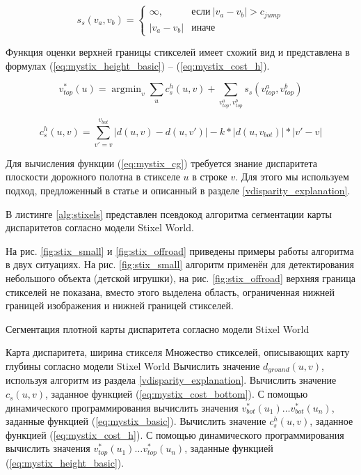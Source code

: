 \documentclass[aps,%
14pt,%
final,%
oneside,
onecolumn,%
musixtex, %
superscriptaddress,%
centertags]{extarticle} %
\DeclareMathOperator*{\argmin}{argmin}
\begin{document}
\begin{equation}\label{eq:mystix_ss}
s_s(v_a, v_b)=
\begin{cases}
  \infty,     & \text{если}\ |v_a - v_b| > c_{jump} \\
  |v_a - v_b| & \text{иначе}
\end{cases}
\end{equation}

Функция оценки верхней границы стикселей имеет схожий вид и представлена в формулах (\ref{eq:mystix_height_basic}) -- (\ref{eq:mystix_cost_h}).

\begin{equation}\label{eq:mystix_height_basic}
v_{top}^*(u) = \argmin_{v}\sum_u c_s^h(u, v) + \sum_{v_{top}^a, v_{top}^b} s_s(v_{top}^a, v_{top}^b)
\end{equation}

\begin{equation}\label{eq:mystix_cost_h}
c_s^h(u, v) = \sum_{v'=v}^{v_{bot}} |d(u, v) - d(u, v')| - k * |d(u, v_{bot})| * |v' - v|
\end{equation}

Для вычисления функции (\ref{eq:mystix_cg}) требуется знание диспаритета плоскости дорожного полотна в стикселе $u$ в строке $v$. Для этого мы используем подход, предложенный в статье \cite{labayrade2002real} и описанный в разделе \ref{vdisparity_explanation}.

В листинге \ref{alg:stixels} представлен псевдокод алгоритма сегментации карты диспаритетов согласно модели Stixel World.

На рис. \ref{fig:stix_small} и \ref{fig:stix_offroad} приведены примеры работы алгоритма в двух ситуациях. На рис. \ref{fig:stix_small} алгоритм применён для детектирования небольшого объекта (детской игрушки), на рис. \ref{fig:stix_offroad} верхняя граница стикселей не показана, вместо этого выделена область, ограниченная нижней границей изображения и нижней границей стикселей.



\begin{algorithm}[H]
\caption{Сегментация плотной карты диспаритета согласно модели Stixel World}
\label{alg:stixels}
\begin{algorithmic}[1]
\Require Карта диспаритета, ширина стикселя
\Ensure Множество стикселей, описывающих карту глубины согласно модели Stixel World
\State Вычислить значение $d_{ground}(u, v)$, используя алгоритм из раздела \ref{vdisparity_explanation}.
\State Вычислить значение $c_s(u, v)$, заданное функцией (\ref{eq:mystix_cost_bottom}).
\EndFor
\State С помощью динамического программирования вычислить значения $v_{bot}^*(u_1) \dots v_{bot}^*(u_n)$, заданные функцией (\ref{eq:mystix_basic}).
\State Вычислить значение $c_s^h(u, v)$, заданное функцией (\ref{eq:mystix_cost_h}).
\EndFor
\State С помощью динамического программирования вычислить значения $v_{top}^*(u_1) \dots v_{top}^*(u_n)$, заданные функцией (\ref{eq:mystix_height_basic}).
\end{algorithmic}
\end{algorithm}
\end{document}
